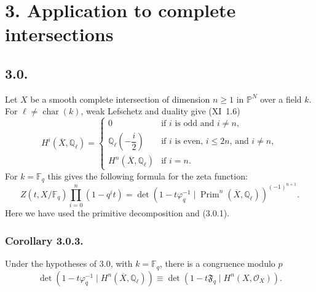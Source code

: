 \section*{3. Application to complete intersections}

\subsection*{3.0.}
Let $X$ be a smooth complete intersection of dimension $n\geq1$ in
$\mathbb P^N$ over a field $k$.  For
$\ell\ne\operatorname{char}(k)$, weak Lefschetz and duality give
(XI~1.6)
\begin{equation}\tag{3.0.1}
H^i(\overline X,\mathbb Q_\ell)=
\begin{cases}
0 & \text{if $i$ is odd and $i\ne n$},\\[1.5ex]
\mathbb Q_\ell\!\left(-\dfrac{i}{2}\right)
  & \text{if $i$ is even, $i\leq2n$, and $i\ne n$},\\[1.5ex]
H^n(\overline X,\mathbb Q_\ell) & \text{if $i=n$}.
\end{cases}
\end{equation}
For $k=\mathbb F_q$ this gives the following formula for the zeta function:
\begin{equation}\tag{3.0.2}
Z(t,X/\mathbb F_q)\prod_{i=0}^{n}(1-q^it)
=\det\!\left(1-t\varphi_q^{-1}\mid
\operatorname{Prim}^n(\overline X,\mathbb Q_\ell)\right)^{(-1)^{n+1}}.
\end{equation}
Here we have used the primitive decomposition and (3.0.1).

\subsubsection*{Corollary 3.0.3.}
Under the hypotheses of 3.0, with $k=\mathbb F_q$, there is a congruence
modulo $p$
\[
\det\!\left(1-t\varphi_q^{-1}\mid
H^n(\overline X,\mathbb Q_\ell)\right)
\equiv
\det\!\left(1-t\mathfrak F_q\mid H^n(X,\mathcal O_X)\right).
\]

